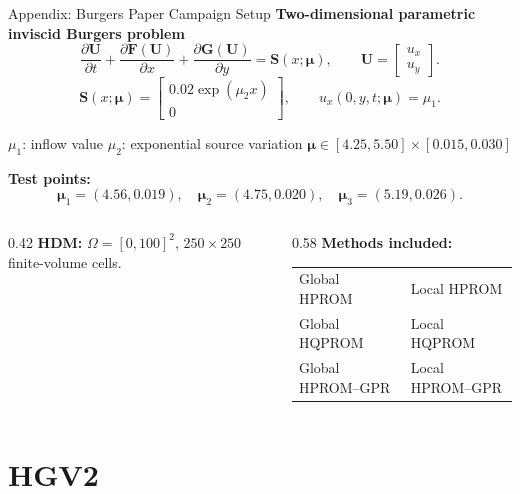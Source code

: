 \documentclass[aspectratio=169]{beamer}
\begin{document}
\begin{frame}{Appendix: Burgers Paper Campaign Setup}
\small
\textbf{Two-dimensional parametric inviscid Burgers problem}
\[
\frac{\partial \mathbf U}{\partial t}
+\frac{\partial \mathbf F(\mathbf U)}{\partial x}
+\frac{\partial \mathbf G(\mathbf U)}{\partial y}
=\mathbf S(x;\boldsymbol\mu),
\qquad
\mathbf U=
\begin{bmatrix}
u_x\\u_y
\end{bmatrix}.
\]
\[
\mathbf S(x;\boldsymbol\mu)=
\begin{bmatrix}
0.02\exp(\mu_2 x)\\0
\end{bmatrix},
\qquad
u_x(0,y,t;\boldsymbol\mu)=\mu_1.
\]

\vspace{-0.35em}
\centering
\(\mu_1\): inflow value \qquad
\(\mu_2\): exponential source variation \qquad
\(\boldsymbol\mu\in[4.25,5.50]\times[0.015,0.030]\)
\par

\vspace{0.35em}
\textbf{Test points:}
\[
\boldsymbol\mu_1=(4.56,0.019),\quad
\boldsymbol\mu_2=(4.75,0.020),\quad
\boldsymbol\mu_3=(5.19,0.026).
\]

\vspace{-0.25em}
\begin{columns}[T,onlytextwidth]
\begin{column}{0.42\textwidth}
\textbf{HDM:} $\Omega=[0,100]^2$, $250\times250$ finite-volume cells.
\end{column}
\begin{column}{0.58\textwidth}
\textbf{Methods included:}
\begin{tabular}{ll}
Global HPROM & Local HPROM \\
Global HQPROM & Local HQPROM \\
Global HPROM--GPR & Local HPROM--GPR
\end{tabular}
\end{column}
\end{columns}
\end{frame}

\BurgersSolutionFigureFrames

\section{HGV2}
\end{document}
